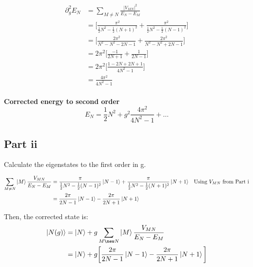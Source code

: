 \documentclass{article}
\begin{document}
\begin{align*}
    \partial_g^2 E_N
    &= \sum_{M \neq N}\frac{|V_{MN}|^2}{E_N - E_M} \\
    &= \bigg[ \frac{\pi^2}{\frac{1}{2}N^2 - \frac{1}{2}(N+1)^2} + \frac{\pi^2}{\frac{1}{2}N^2 - \frac{1}{2}(N-1)^2} \bigg] \\
    &= \bigg[ \frac{2 \pi^2}{N^2 - N^2 - 2N -1} + \frac{2 \pi^2}{N^2 - N^2 + 2N -1} \bigg] \\
    &= 2\pi^2 \bigg[ \frac{-1}{2N+1} + \frac{1}{2N-1} \bigg] \\
    &= 2\pi^2 \bigg[ \frac{1-2N + 2N+1}{4N^2-1} \bigg] \\
    &= \frac{4 \pi^2}{4N^2-1} \\
\end{align*}

{\bf Corrected energy to second order}
\[ E_N = \frac{1}{2}N^2 + g^2 \frac{4 \pi^2}{4N^2-1} + \ldots \]



\subsection*{Part ii}
Calculate the eigenstates to the first order in g.

\begin{align*}
    \sum_{M \neq N} \ket{M} \frac{V_{MN}}{E_N - E_M}
    &= \frac{\pi}{\frac{1}{2}N^2 - \frac{1}{2}(N-1)^2} \ket{N-1} + \frac{\pi}{\frac{1}{2}N^2 - \frac{1}{2}(N+1)^2} \ket{N+1}
        && \text{Using $V_{MN}$ from Part i} \\
    &= \frac{2\pi}{2N-1} \ket{N-1} - \frac{2\pi}{2N+1} \ket{N+1}
\end{align*}

Then, the corrected state is:
\begin{align*}
    \ket{N(g)}
    &= \ket{N} + g\sum_{M \new N} \ket{M} \frac{V_{MN}}{E_N - E_M} \\
    &= \ket{N} + g\bigg[ \frac{2\pi}{2N-1} \ket{N-1} - \frac{2\pi}{2N+1} \ket{N+1} \bigg]
\end{align*}
\end{document}
